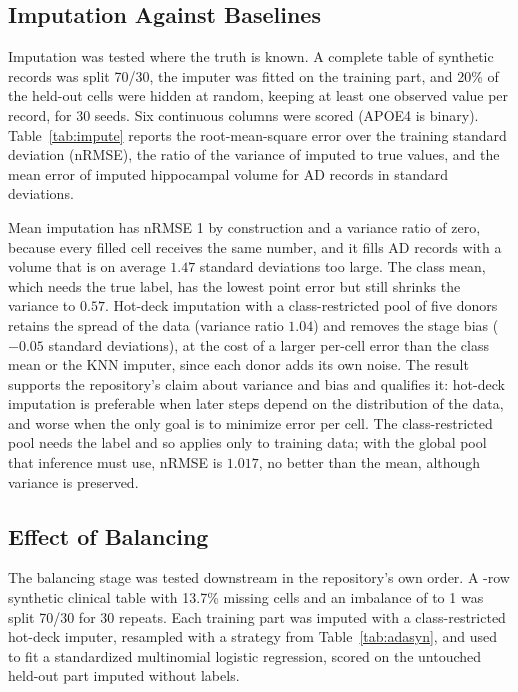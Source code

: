 \documentclass[conference]{IEEEtran}
\begin{document}
\subsection{Imputation Against Baselines}
Imputation was tested where the truth is known. A complete table of \ImpRows{} synthetic records was split 70/30, the imputer was fitted on the training part, and 20\% of the held-out cells were hidden at random, keeping at least one observed value per record, for 30 seeds. Six continuous columns were scored (APOE4 is binary). Table~\ref{tab:impute} reports the root-mean-square error over the training standard deviation (nRMSE), the ratio of the variance of imputed to true values, and the mean error of imputed hippocampal volume for AD records in standard deviations.



Mean imputation has nRMSE 1 by construction and a variance ratio of zero, because every filled cell receives the same number, and it fills AD records with a volume that is on average $1.47$ standard deviations too large. The class mean, which needs the true label, has the lowest point error but still shrinks the variance to $0.57$. Hot-deck imputation with a class-restricted pool of five donors retains the spread of the data (variance ratio $1.04$) and removes the stage bias ($-0.05$ standard deviations), at the cost of a larger per-cell error than the class mean or the KNN imputer, since each donor adds its own noise. The result supports the repository's claim about variance and bias and qualifies it: hot-deck imputation is preferable when later steps depend on the distribution of the data, and worse when the only goal is to minimize error per cell. The class-restricted pool needs the label and so applies only to training data; with the global pool that inference must use, nRMSE is $1.017$, no better than the mean, although variance is preserved.

\subsection{Effect of Balancing}
The balancing stage was tested downstream in the repository's own order. A \AdasynRows-row synthetic clinical table with 13.7\% missing cells and an imbalance of \AdasynBefore{} to 1 was split 70/30 for 30 repeats. Each training part was imputed with a class-restricted hot-deck imputer, resampled with a strategy from Table~\ref{tab:adasyn}, and used to fit a standardized multinomial logistic regression, scored on the untouched held-out part imputed without labels.
\end{document}
